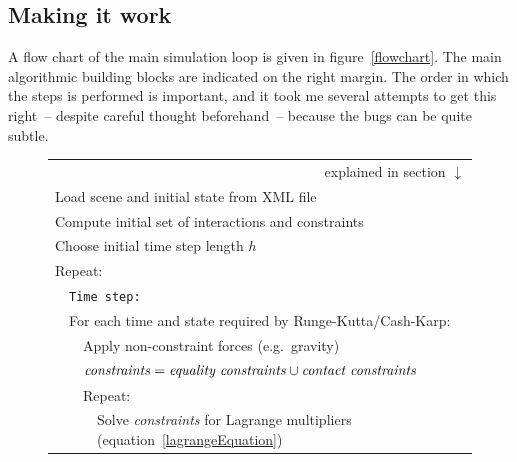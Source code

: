 \subsection{Making it work\label{algorithmImplementation}}

A flow chart of the main simulation loop is given in figure~\ref{flowchart}. The main algorithmic
building blocks are indicated on the right margin. The order in which the steps is performed is
important, and it took me several attempts to get this right~-- despite careful thought
beforehand~-- because the bugs can be quite subtle.

\begin{figure}
\renewcommand{\baselinestretch}{1.3}\small\normalsize
\newcommand{\spx}{\vspace*{\baselineskip}\\}
\newcommand{\curly}[2]{\zerobox{b}{\mbox{$\left\}\:#1\begin{array}{l}#2\end{array}\right.$}}}
\begin{tabular}{|l|l|l|l|@{}l}
\multicolumn{5}{r}{explained in section $\downarrow$}\\\cline{1-4}
\multicolumn{4}{|l|}{Load scene and initial state from XML file}
&\curly{\ref{softwareTools}}{\spx}\hspace*{7mm}\\\cline{1-4}
\multicolumn{4}{|l|}{Compute initial set of interactions and constraints}&
\curly{\ref{meshIntersection}}{\spx}\\\cline{1-4}
\multicolumn{4}{|l|}{Choose initial time step length $h$}\\\cline{1-4}
\multicolumn{4}{|l|}{Repeat:}\\\cline{2-4}
    &\multicolumn{3}{|l|}{\texttt{Time step:}}\\\cline{2-4}
    &\multicolumn{3}{|l|}{For each time and state required by Runge-Kutta/Cash-Karp:}&
    \curly{\ref{solvingODEs}}{\spx}\\\cline{3-4}
        &&\multicolumn{2}{|l|}{Apply non-constraint forces (e.g.\ gravity)}\\\cline{3-4}
        &&\multicolumn{2}{|l|}{$\mbox{\textit{constraints}} = \mbox{\textit{equality constraints}}
        \cup \mbox{\textit{contact constraints}}$}\\\cline{3-4}
        &&\multicolumn{2}{|l|}{Repeat:}\\\cline{4-4}
            &&&Solve \textit{constraints} for Lagrange multipliers (equation~\ref{lagrangeEquation})\\\cline{4-4}

\end{tabular}
\end{figure}
